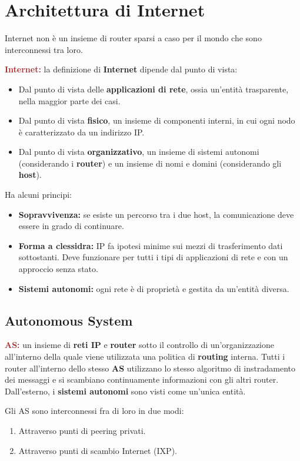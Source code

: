 \section{Architettura di Internet}
Internet non è un insieme di router sparsi a caso per il mondo che sono interconnessi tra loro.
\begin{boxDef}
\textbf{\textcolor{brown}{Internet:}} la definizione di \textbf{Internet} dipende dal punto di vista:
\begin{itemize}
    \item Dal punto di vista delle \textbf{applicazioni di rete}, ossia un'entità trasparente, nella maggior parte dei casi.
    \item Dal punto di vista \textbf{fisico}, un insieme di componenti interni, in cui ogni nodo è caratterizzato da un indirizzo IP.
    \item Dal punto di vista \textbf{organizzativo}, un insieme di sistemi autonomi (considerando i \textbf{router}) e un insieme di nomi e domini (considerando gli \textbf{host}).
\end{itemize}
\end{boxDef}

Ha alcuni principi:
\begin{itemize}
    \item \textbf{Sopravvivenza:} se esiste un percorso tra i due host, la comunicazione deve essere in grado di continuare.
    \item \textbf{Forma a clessidra:} IP fa ipotesi minime sui mezzi di trasferimento dati sottostanti. Deve funzionare per tutti i tipi di applicazioni di rete e con un approccio senza stato.
    \item \textbf{Sistemi autonomi:} ogni rete è di proprietà e gestita da un'entità diversa.
\end{itemize}

\subsection{Autonomous System}
\begin{boxDef}
\textbf{\textcolor{brown}{AS:}} un insieme di \textbf{reti IP} e \textbf{router} sotto il controllo di un'organizzazione all'interno della quale viene utilizzata una politica di \textbf{routing} interna. Tutti i router all'interno dello stesso \textbf{AS} utilizzano lo stesso algoritmo di instradamento dei messaggi e si scambiano continuamente informazioni con gli altri router.
Dall'esterno, i \textbf{sistemi autonomi} sono visti come un'unica entità.
\end{boxDef}
Gli AS sono interconnessi fra di loro in due modi:
\begin{enumerate}
    \item Attraverso punti di peering privati.
    \item Attraverso punti di scambio Internet (IXP).
\end{enumerate}

